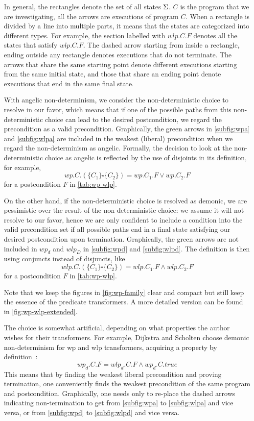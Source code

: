 In general, the rectangles denote the set of all states $\S$. 
$C$ is the program that we are investigating, all the arrows are executions of program $C$. 
When a rectangle is divided by a line into multiple parts, it means that the states are categorized into different types. 
For example, the section  labelled with $wlp.C.F$ denotes all the states that satisfy $wlp.C.F$. 
The dashed arrow starting from inside a rectangle, ending outside any rectangle denotes executions that do not terminate. 
The arrows that share the same starting point denote different executions starting from the same initial state, and those that share an ending point denote executions that end in the same final state. 

With angelic non-determinism, we consider the non-deterministic choice to resolve in our favor, which means that if one of the possible paths from this non-deterministic choice can lead to the desired postcondition, we regard the precondition as a valid precondition. 
Graphically, the green arrows in \autoref{subfig:wpa} and \autoref{subfig:wlpa} are included in the weakest (liberal) precondition when we regard the non-determinism as angelic. 
Formally, the decision to look at the non-deterministic choice as angelic is reflected by the use of disjoints in its definition, for example, 
$$wp.C.(\{C_1\}\square \{C_2\}) = wp.C_1.F\vee wp.C_2.F$$ for a postcondition $F$ in \autoref{tab:wp-wlp}.

On the other hand, if the non-deterministic choice is resolved as demonic, we are pessimistic over the result of the non-deterministic choice: we assume it will not resolve to our favor, hence we are only confident to include a condition into the valid precondition set if all possible paths end in a final state satisfying our desired postcondition upon termination. 
Graphically, the green arrows are not included in $wp_d$ and $wlp_D$ in \autoref{subfig:wpd} and \autoref{subfig:wlpd}. 
The definition is then using conjuncts instead of disjuncts, like 
$$wlp.C.(\{C_1\}\square \{C_2\}) = wlp.C_1.F\wedge wlp.C_2.F$$ for a postcondition $F$ in \autoref{tab:wp-wlp}.

Note that we keep the figures in \autoref{fig:wp-family} clear and compact but still keep the essence of the predicate transformers. 
A more detailed version can be found in \autoref{fig:wp-wlp-extended}.  

The choice is somewhat artificial, depending on what properties the author wishes for their transformers.
For example, Dijkstra and Scholten choose demonic non-determinism for wp and wlp transformers, acquiring a property by definition~\cite{dijkstra90}: 
$$wp_d.C.F = wlp_d.C.F \wedge wp_d.C.true $$
This means that by finding the weakest liberal precondition and proving termination, one conveniently finds the weakest precondition of the same program and postcondition. 
Graphically, one needs only to re-place the dashed arrows indicating non-termination to get from \autoref{subfig:wpa} to \autoref{subfig:wlpa} and vice versa, or from  \autoref{subfig:wpd} to \autoref{subfig:wlpd} and vice versa. 

